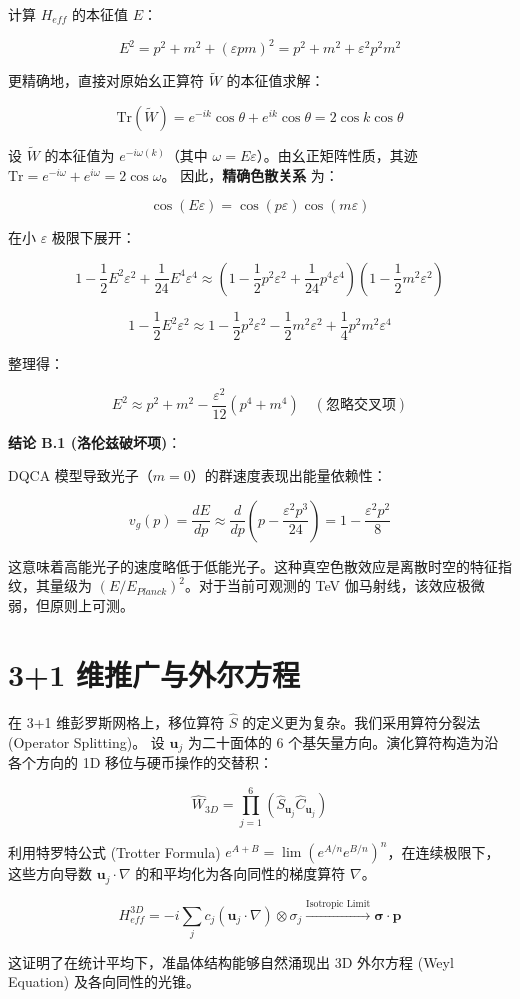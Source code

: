 计算 $H_{eff}$ 的本征值 $E$：

\[E^2 = p^2 + m^2 + (\varepsilon pm)^2 = p^2 + m^2 + \varepsilon^2 p^2 m^2\]

更精确地，直接对原始幺正算符 $\tilde{W}$ 的本征值求解：

\[\text{Tr}(\tilde{W}) = e^{-ik} \cos\theta + e^{ik} \cos\theta = 2 \cos k \cos \theta\]

设 $\tilde{W}$ 的本征值为 $e^{-i \omega(k)}$（其中 $\omega = E \varepsilon$）。由幺正矩阵性质，其迹 $\text{Tr} = e^{-i\omega} + e^{i\omega} = 2 \cos \omega$。
因此，\textbf{精确色散关系} 为：

\[\cos(E \varepsilon) = \cos(p \varepsilon) \cos(m \varepsilon)\]

在小 $\varepsilon$ 极限下展开：

\[1 - \frac{1}{2}E^2\varepsilon^2 + \frac{1}{24}E^4\varepsilon^4 \approx \left(1 - \frac{1}{2}p^2\varepsilon^2 + \frac{1}{24}p^4\varepsilon^4\right) \left(1 - \frac{1}{2}m^2\varepsilon^2\right)\]

\[1 - \frac{1}{2}E^2\varepsilon^2 \approx 1 - \frac{1}{2}p^2\varepsilon^2 - \frac{1}{2}m^2\varepsilon^2 + \frac{1}{4}p^2 m^2 \varepsilon^4\]

整理得：

\[E^2 \approx p^2 + m^2 - \frac{\varepsilon^2}{12} (p^4 + m^4) \quad (\text{忽略交叉项})\]

\textbf{结论 B.1 (洛伦兹破坏项)}：

DQCA 模型导致光子（$m=0$）的群速度表现出能量依赖性：

\[v_g(p) = \frac{dE}{dp} \approx \frac{d}{dp} \left( p - \frac{\varepsilon^2 p^3}{24} \right) = 1 - \frac{\varepsilon^2 p^2}{8}\]

这意味着高能光子的速度略低于低能光子。这种真空色散效应是离散时空的特征指纹，其量级为 $(E/E_{Planck})^2$。对于当前可观测的 TeV 伽马射线，该效应极微弱，但原则上可测。

\section{3+1 维推广与外尔方程}

在 3+1 维彭罗斯网格上，移位算符 $\hat{S}$ 的定义更为复杂。我们采用算符分裂法 (Operator Splitting)。
设 $\mathbf{u}_j$ 为二十面体的 6 个基矢量方向。演化算符构造为沿各个方向的 1D 移位与硬币操作的交替积：

\[\hat{W}_{3D} = \prod_{j=1}^6 \left( \hat{S}_{\mathbf{u}_j} \hat{C}_{\mathbf{u}_j} \right)\]

利用特罗特公式 (Trotter Formula) $e^{A+B} = \lim (e^{A/n} e^{B/n})^n$，在连续极限下，这些方向导数 $\mathbf{u}_j \cdot \nabla$ 的和平均化为各向同性的梯度算符 $\nabla$。

\[H_{eff}^{3D} = -i \sum_{j} c_j (\mathbf{u}_j \cdot \nabla) \otimes \sigma_{j} \xrightarrow{\text{Isotropic Limit}} \boldsymbol{\sigma} \cdot \mathbf{p}\]

这证明了在统计平均下，准晶体结构能够自然涌现出 3D 外尔方程 (Weyl Equation) 及各向同性的光锥。
